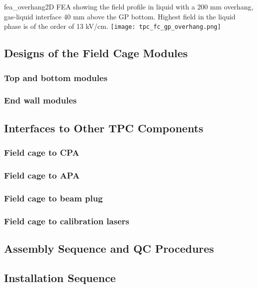 \begin{cdrfigure}{fea_overhang}{2D FEA showing the field profile in liquid with a 200 mm overhang, gas-liquid interface 40 mm above the GP bottom. Highest field in the liquid phase is of the order of 13 kV/cm.}
\texttt{[image: tpc\_fc\_gp\_overhang.png]}
\end{cdrfigure}








\subsection{Designs of the Field Cage Modules}

\subsubsection{Top and bottom modules}

\subsubsection{End wall modules}



\subsection{Interfaces to Other TPC Components}

\subsubsection{Field cage to CPA}

\subsubsection{Field cage to APA}

\subsubsection{Field cage to beam plug}

\subsubsection{Field cage to calibration lasers}



\subsection{Assembly Sequence and QC Procedures}


\subsection{Installation Sequence}



 


